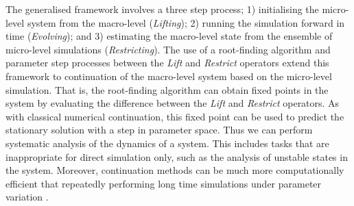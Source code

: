 \documentclass[11pt]{article}
\begin{document}


The generalised framework involves a three step process; 1) initialising the micro-level system from the macro-level ({\em Lifting}); 2) running the simulation forward in time ({\em Evolving}); and 3) estimating the macro-level state from the ensemble of micro-level simulations ({\em Restricting}). The use of a root-finding algorithm and parameter step processes between the {\em Lift} and {\em Restrict} operators extend this framework to continuation of the macro-level system based on the micro-level simulation. That is, the root-finding algorithm can obtain fixed points in the system by evaluating the difference between the {\em Lift} and {\em Restrict} operators. As with classical numerical continuation, this fixed point can be used to predict the stationary solution with a step in parameter space. Thus we can perform systematic analysis of the dynamics of a system. This includes tasks that are inappropriate for direct simulation only, such as the analysis of unstable states in the system. Moreover, continuation methods can be much more computationally efficient that repeatedly performing long time simulations under parameter variation \cite{Thomas2016ember}.
\end{document}
